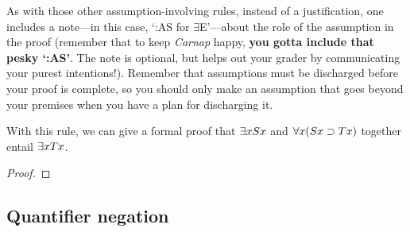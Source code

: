 As with those other assumption-involving rules, instead of a justification, one includes a note---in this case, `:AS for $\exists${}E'---about the role of the assumption in the proof {\color{black} (remember that to keep \textit{Carnap} happy, \textbf{you gotta include that pesky `:AS'}. The note is optional, but helps out your grader by communicating your purest intentions!)}. Remember that assumptions must be discharged before your proof is complete, so you should only make an assumption that goes beyond your premises when you have a plan for discharging it.



With this rule, we can give a formal proof that $\exists x Sx$ and $\forall x(Sx \supset Tx)$ together entail $\qt{\exists}{x} Tx$.

\begin{proof}
	 \pr{}
	\open
		 
	\close
\end{proof}


\iffalse


\begin{proof}
	\hypo{es}{\qt{\exists}{x} Sx} \prs{}{}
	\hypo{ast}{\qt{\forall}{x}(Sx \eif Tx)}\prs{want $\qt{\exists}{x} Tx$}{} 
	\open
		\hypo{s}{Sa}\ass{for $\exists${}E}{}
		\have{st}{Sa \eif Ta}\Ae{ast}
		\have{t}{Ta} \ce{s,st}
		\have{et1}{\qt{\exists}{x} Tx}\Ei{t}
	\close
	\have{et2}{\qt{\exists}{x} Tx}\Ee{es,s-et1}
\end{proof}

\fi 

\subsection{Quantifier negation}

